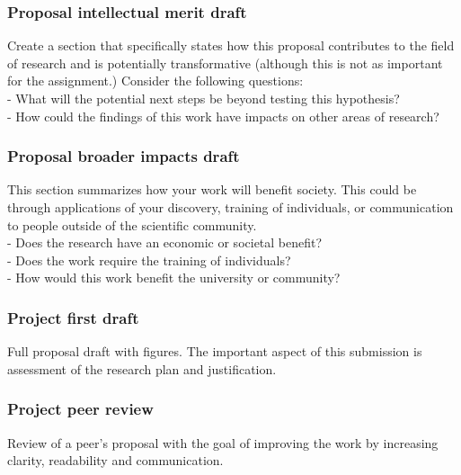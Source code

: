\documentclass[11pt,]{article}
\begin{document}
\hypertarget{proposal-intellectual-merit-draft}{%
\subsubsection{Proposal intellectual merit
draft}\label{proposal-intellectual-merit-draft}}

Create a section that specifically states how this proposal contributes
to the field of research and is potentially transformative (although
this is not as important for the assignment.) Consider the following
questions:\\
- What will the potential next steps be beyond testing this
hypothesis?\\
- How could the findings of this work have impacts on other areas of
research?

\hypertarget{proposal-broader-impacts-draft}{%
\subsubsection{Proposal broader impacts
draft}\label{proposal-broader-impacts-draft}}

This section summarizes how your work will benefit society. This could
be through applications of your discovery, training of individuals, or
communication to people outside of the scientific community.\\
- Does the research have an economic or societal benefit?\\
- Does the work require the training of individuals?\\
- How would this work benefit the university or community?

\hypertarget{project-first-draft}{%
\subsubsection{Project first draft}\label{project-first-draft}}

Full proposal draft with figures. The important aspect of this
submission is assessment of the research plan and justification.

\hypertarget{project-peer-review}{%
\subsubsection{Project peer review}\label{project-peer-review}}

Review of a peer's proposal with the goal of improving the work by
increasing clarity, readability and communication.
\end{document}
